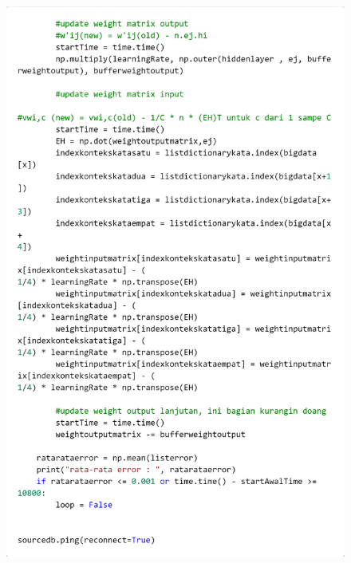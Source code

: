 \documentclass[12pt]{report}
\begin{document}
\begin{figure}[H]
\centering
\includegraphics[scale=0.3]{trainingcbow4kata4}
\end{figure}
\end{document}

